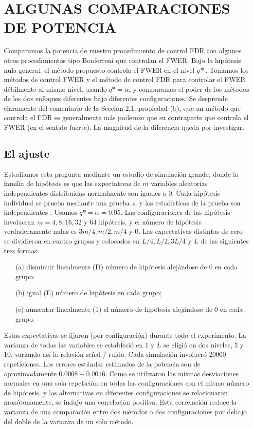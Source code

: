 \documentclass[11pt,letterpaper]{article}
\begin{document}
\section{ALGUNAS COMPARACIONES DE POTENCIA} 
Comparamos la potencia de nuestro procedimiento de control FDR con algunos otros procedimientos tipo Bonferroni que controlan el FWER. Bajo la hipótesis nula general, el método propuesto controla el FWER en el nivel $q*$. Tomamos los métodos de control FWER y el método de control FDR para controlar el FWER débilmente al mismo nivel, usando $q*=\alpha$, y comparamos el poder de los métodos de los dos enfoques diferentes bajo diferentes configuraciones. Se desprende claramente del comentario de la Sección 2.1, propiedad (b), que un método que controla el FDR es generalmente más poderoso que su contraparte que controla el FWER (en el sentido fuerte). La magnitud de la diferencia queda por investigar.

\subsection{El ajuste} 
Estudiamos esta pregunta mediante un estudio de simulación grande, donde la familia de hipótesis es que las expectativas de $m$ variables aleatorias independientes distribuidas normalmente son iguales a 0. Cada hipótesis individual se prueba mediante una prueba $z$, y las estadísticas de la prueba son independientes . Usamos $q* = \alpha = 0.05.$ Las configuraciones de las hipótesis involucran $m = 4, 8, 16, 32$ y 64 hipótesis, y el número de hipótesis verdaderamente nulas es $3 m / 4, m / 2, m/4$ y 0. Las expectativas distintas de cero se dividieron en cuatro grupos y colocados en $L / 4, L / 2, 3L / 4$ y $L$ de las siguientes tres formas:
\begin{itemize}
\item[(a)] disminuir linealmente (D) número de hipótesis alejándose de 0 en cada grupo; 
\item[(b)] igual (E) número de hipótesis en cada grupo;
\item[(c)] aumentar linealmente (1) el número de hipótesis alejándose de 0 en cada grupo. 
\end{itemize}
Estas expectativas se fijaron (por configuración) durante todo el experimento.
La varianza de todas las variables se estableció en 1 y $L$ se eligió en dos niveles, 5 y 10, variando así la relación señal / ruido.
Cada simulación involucró 20000 repeticiones. Los errores estándar estimados de la potencia son de aproximadamente $0.0008-0.0016$. Como se utilizaron las mismas desviaciones normales en una sola repetición en todas las configuraciones con el mismo número de hipótesis, y las alternativas en diferentes configuraciones se relacionaron monótonamente, se indujo una correlación positiva. Esta correlación reduce la varianza de una comparación entre dos métodos o dos configuraciones por debajo del doble de la varianza de un solo método.
\end{document}
